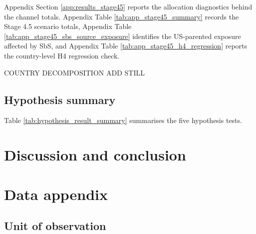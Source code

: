 \documentclass[11pt,a4paper]{article}
\begin{document}
Appendix Section \ref{app:results_stage45} reports the allocation diagnostics behind the channel totals. Appendix Table \ref{tab:app_stage45_summary} records the Stage 4.5 scenario totals, Appendix Table \ref{tab:app_stage45_sbs_source_exposure} identifies the US-parented exposure affected by SbS, and Appendix Table \ref{tab:app_stage45_h4_regression} reports the country-level H4 regression check.

COUNTRY DECOMPOSITION ADD STILL

\subsection{Hypothesis summary}\label{sec:results_hypotheses}



Table \ref{tab:hypothesis_result_summary} summarises the five hypothesis tests. 


\section{Discussion and conclusion}\label{sec:discussion}

\newpage
\printbibliography[heading=bibintoc]

\newpage
\appendix
\renewcommand{\thesection}{\Alph{section}}
\renewcommand{\theHsection}{appendix.\Alph{section}}
\renewcommand{\theHsubsection}{appendix.\Alph{section}.\arabic{subsection}}
\renewcommand{\theHsubsubsection}{appendix.\Alph{section}.\arabic{subsection}.\arabic{subsubsection}}
\renewcommand{\thetable}{\Alph{section}.\arabic{table}}
\renewcommand{\thefigure}{\Alph{section}.\arabic{figure}}
\renewcommand{\theequation}{\Alph{section}.\arabic{equation}}
\renewcommand{\theHtable}{appendix.\Alph{section}.\arabic{table}}
\renewcommand{\theHfigure}{appendix.\Alph{section}.\arabic{figure}}
\renewcommand{\theHequation}{appendix.\Alph{section}.\arabic{equation}}
\setcounter{table}{0}
\setcounter{figure}{0}
\setcounter{equation}{0}

\section{Data appendix}\label{app:data}

\subsection{Unit of observation}\label{app:unit_obs}
\end{document}
